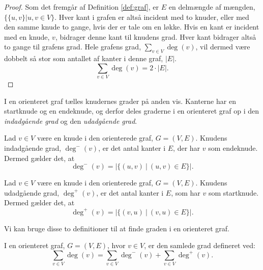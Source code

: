 \begin{proof}
Som det fremgår af Definition \ref{def:graf}, er $E$ en delmængde af mængden, $\{\{u,v\}|u,v \in V \}$. Hver kant i grafen er altså incident med to knuder, eller med den samme knude to gange, hvis der er tale om en løkke. Hvis en kant er incident med en knude, $v$, bidrager denne kant til knudens grad. Hver kant bidrager altså to gange til grafens grad. Hele grafens grad, $\sum_{v \in V} { } \deg(v)$, vil dermed være dobbelt så stor som antallet af kanter i denne graf, $|E|$. 
\begin{equation}
\sum_{v \in V} { } \deg(v) = 2 \cdot |E|.
\end{equation} 
\end{proof}

I en orienteret graf tælles knudernes grader på anden vis. Kanterne har en startknude og en endeknude, og derfor deles graderne i en orienteret graf op i den \emph{indadgående grad} og den \emph{udadgående grad}. 

\begin{defn}
Lad $v \in V$ være en knude i den orienterede graf, $G = (V,E)$. Knudens indadgående grad, $\deg^-(v)$, er det antal kanter i $E$, der har $v$ som endeknude. Dermed gælder det, at
\begin{equation}
\deg^-(v)=|\{(u,v) \ | \ (u,v) \in E \}|.
\end{equation}
\end{defn}

\begin{defn}
Lad $v \in V$ være en knude i den orienterede graf, $G = (V,E)$. Knudens udadgående grad, $\deg^+(v)$, er det antal kanter i $E$, som har $v$ som startknude. Dermed gælder det, at
\begin{equation}
\deg^+(v)=|\{(v,u) \ | \ (v,u) \in E \}|.
\end{equation}
\end{defn}

Vi kan bruge disse to definitioner til at finde graden i en orienteret graf. 

\begin{defn}
I en orienteret graf, $G = (V,E)$, hvor $v \in V$, er den samlede grad defineret ved: 
\begin{equation}
\sum_{v \in V} { } \deg(v) = \sum_{v \in V} { } \deg^{-}(v) + \sum_{v \in V} { } \deg^{+}(v).
\end{equation}
\end{defn}

